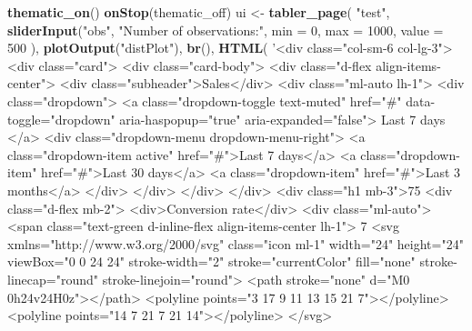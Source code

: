 \documentclass[]{book}
\newenvironment{Shaded}{\begin{snugshade}}{\end{snugshade}}
\newcommand{\DataTypeTok}[1]{\textcolor[rgb]{0.13,0.29,0.53}{#1}}
\newcommand{\DecValTok}[1]{\textcolor[rgb]{0.00,0.00,0.81}{#1}}
\newcommand{\KeywordTok}[1]{\textcolor[rgb]{0.13,0.29,0.53}{\textbf{#1}}}
\newcommand{\NormalTok}[1]{#1}
\newcommand{\StringTok}[1]{\textcolor[rgb]{0.31,0.60,0.02}{#1}}
\begin{document}
\begin{Shaded}
\begin{Highlighting}[]
\KeywordTok{thematic_on}\NormalTok{()}
\KeywordTok{onStop}\NormalTok{(thematic_off)}
\NormalTok{ui <-}\StringTok{ }\KeywordTok{tabler_page}\NormalTok{(}
  \StringTok{"test"}\NormalTok{, }
  \KeywordTok{sliderInput}\NormalTok{(}\StringTok{"obs"}\NormalTok{, }\StringTok{"Number of observations:"}\NormalTok{,}
              \DataTypeTok{min =} \DecValTok{0}\NormalTok{, }\DataTypeTok{max =} \DecValTok{1000}\NormalTok{, }\DataTypeTok{value =} \DecValTok{500}
\NormalTok{  ),}
  \KeywordTok{plotOutput}\NormalTok{(}\StringTok{"distPlot"}\NormalTok{),}
  \KeywordTok{br}\NormalTok{(),}
  \KeywordTok{HTML}\NormalTok{(}
    \StringTok{'<div class="col-sm-6 col-lg-3">}
\StringTok{   <div class="card">}
\StringTok{      <div class="card-body">}
\StringTok{         <div class="d-flex align-items-center">}
\StringTok{            <div class="subheader">Sales</div>}
\StringTok{            <div class="ml-auto lh-1">}
\StringTok{               <div class="dropdown">}
\StringTok{                  <a class="dropdown-toggle text-muted" href="#" data-toggle="dropdown" aria-haspopup="true" aria-expanded="false">}
\StringTok{                  Last 7 days}
\StringTok{                  </a>}
\StringTok{                  <div class="dropdown-menu dropdown-menu-right">}
\StringTok{                     <a class="dropdown-item active" href="#">Last 7 days</a>}
\StringTok{                     <a class="dropdown-item" href="#">Last 30 days</a>}
\StringTok{                     <a class="dropdown-item" href="#">Last 3 months</a>}
\StringTok{                  </div>}
\StringTok{               </div>}
\StringTok{            </div>}
\StringTok{         </div>}
\StringTok{         <div class="h1 mb-3">75%
\StringTok{         <div class="d-flex mb-2">}
\StringTok{            <div>Conversion rate</div>}
\StringTok{            <div class="ml-auto">}
\StringTok{               <span class="text-green d-inline-flex align-items-center lh-1">}
\StringTok{                  7%
\StringTok{                  <svg xmlns="http://www.w3.org/2000/svg" class="icon ml-1" width="24" height="24" viewBox="0 0 24 24" stroke-width="2" stroke="currentColor" fill="none" stroke-linecap="round" stroke-linejoin="round">}
\StringTok{                     <path stroke="none" d="M0 0h24v24H0z"></path>}
\StringTok{                     <polyline points="3 17 9 11 13 15 21 7"></polyline>}
\StringTok{                     <polyline points="14 7 21 7 21 14"></polyline>}
\StringTok{                  </svg>}
}}
\end{Highlighting}
\end{Shaded}
\end{document}
